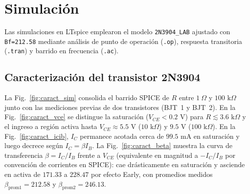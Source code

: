 \documentclass[conference]{IEEEtran}
\begin{document}
\begin{table}[htbp]
\centering
\caption{Resumen de par\'ametros te\'oricos calculados ($\beta = 212.58$, $V_{CC} = 12\text{ V}$, $R_L = 10\text{ k}\Omega$).}
\label{tab:resumen_teo}
\end{table}

\section{Simulaci\'on}

Las simulaciones en LTspice emplearon el modelo \texttt{2N3904\_LAB} ajustado con \texttt{Bf=212.58} mediante an\'alisis de punto de operaci\'on (\texttt{.op}), respuesta transitoria (\texttt{.tran}) y barrido en frecuencia (\texttt{.ac}).

\subsection{Caracterizaci\'on del transistor 2N3904}

La Fig.~\ref{fig:caract_sim} consolida el barrido SPICE de $R$ entre $1\ \Omega$ y $100\text{ k}\Omega$ junto con las mediciones previas de dos transistores (BJT~1 y BJT~2). En la Fig.~\ref{fig:caract_vce} se distingue la saturaci\'on ($V_{CE} < 0.2\text{ V}$) para $R \lesssim 3.6\text{ k}\Omega$ y el ingreso a regi\'on activa hasta $V_{CE} \approx 5.5\text{ V}$ ($10\text{ k}\Omega$) y $9.5\text{ V}$ ($100\text{ k}\Omega$). En la Fig.~\ref{fig:caract_icib}, $I_C$ permanece acotada cerca de $99.5\text{ mA}$ en saturaci\'on y luego decrece seg\'un $I_C = \beta I_B$. La Fig.~\ref{fig:caract_beta} muestra la curva de transferencia $\beta = I_C/I_B$ frente a $V_{CE}$ (equivalente en magnitud a $-I_C/I_B$ por convenci\'on de corrientes en SPICE): cae dr\'asticamente en saturaci\'on y asciende en activa de $171.33$ a $228.47$ por efecto Early, con promedios medidos $\beta_{\mathrm{prom1}} = 212.58$ y $\beta_{\mathrm{prom2}} = 246.13$.
\end{document}
